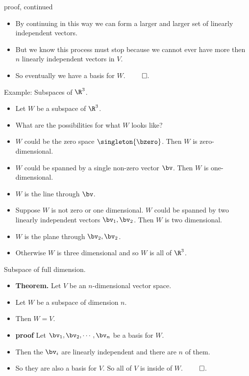 \documentclass{beamer}
\begin{document}
\begin{frame}{proof, continued}

\begin{itemize}
\item By continuing in this way we can form a larger and larger set of linearly independent vectors.
\item But we know this process must stop because we cannot ever have more then $n$ linearly independent vectors in $V$.
\item So eventually we have a basis for $W$. $\qed$.
\end{itemize}

\end{frame}

\begin{frame}{Example: Subspaces of $\R^3$.}


\begin{itemize}
\item Let $W$ be a subspace of $\R^3$.
\item What are the possibilities for what $W$ looks like?
\item $W$ could be the zero space $\singleton{\bzero}$. Then $W$ is zero-dimensional.
\item $W$ could be spanned by a single non-zero vector $\bv$. Then $W$ is one-dimensional.
\item $W$ is the line through $\bv$.
\item Suppose $W$ is not zero or one dimensional. $W$ could be spanned by two linearly independent vectors $\bv_1,\bv_2$. Then $W$ is two dimensional.
\item $W$ is the plane through $\bv_2,\bv_2$.
\item Otherwise $W$ is three dimensional and so $W$ is all of $\R^3$.
\end{itemize}

\end{frame}

\begin{frame}{Subspace of full dimension.}

\begin{itemize}
\item \textbf{Theorem.} Let $V$ be an $n$-dimensional vector space.
\item Let $W$ be a subspace of dimension $n$.
\item Then $W=V$.
\item \textbf{proof} Let $\bv_1,\bv_2,\cdots,\bv_n$ be a basis for $W$.
\item Then the $\bv_i$ are linearly independent and there are $n$ of them.
\item So they are also a basis for $V$. So all of $V$ is inside of $W$. $\qed$.
\end{itemize}

\end{frame}
\end{document}

